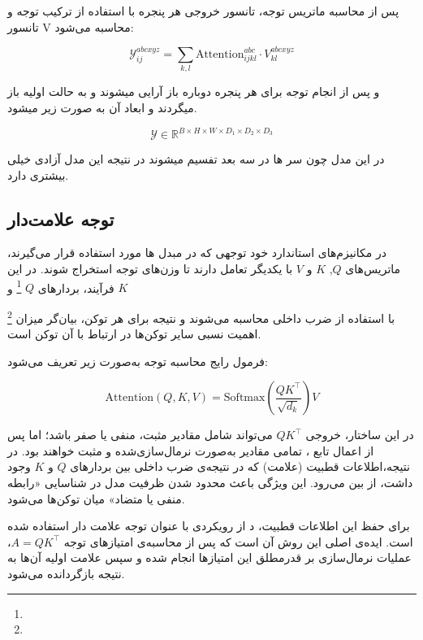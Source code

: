 پس از محاسبه ماتریس توجه، تانسور خروجی هر پنجره با استفاده از ترکیب توجه و تانسور V محاسبه می‌شود:

\begin{equation}
	\mathcal{Y}_{ij}^{abcxyz} = \sum_{k,l} \text{Attention}_{ijkl}^{abc} \cdot V_{kl}^{abcxyz}
\end{equation}


و پس از انجام توجه برای هر پنجره دوباره باز آرایی میشوند و به حالت اولیه باز میگردند و ابعاد آن به صورت زیر میشود.

\[
\mathcal{Y} \in \mathbb{R}^{B \times H \times W \times D_1 \times D_2 \times D_3}
\]

در این مدل چون سر ها در سه بعد تفسیم میشوند در نتیجه این مدل آزادی خیلی بیشتری دارد.






\subsection{توجه علامت‌دار}

در مکانیزم‌های استاندارد خود توجهی که در مبدل ها مورد استفاده قرار می‌گیرند، ماتریس‌های $Q$, $K$ و $V$ با یکدیگر تعامل دارند تا وزن‌های توجه استخراج شوند. در این فرآیند، بردارهای $Q$  \footnote{}
 و $K$ 
 
 \footnote{}
  با استفاده از ضرب داخلی محاسبه می‌شوند و نتیجه برای هر توکن، بیان‌گر میزان اهمیت نسبی سایر توکن‌ها در ارتباط با آن توکن است.

فرمول رایج محاسبه توجه به‌صورت زیر تعریف می‌شود:

\begin{equation}
	\text{Attention}(Q, K, V) = \text{Softmax}\left( \frac{QK^\top}{\sqrt{d_k}} \right) V
\end{equation}

در این ساختار، خروجی $QK^\top$ می‌تواند شامل مقادیر مثبت، منفی یا صفر باشد؛ اما پس از اعمال تابع ، تمامی مقادیر به‌صورت نرمال‌سازی‌شده و مثبت خواهند بود. در نتیجه،اطلاعات قطبیت (علامت) که در نتیجه‌ی ضرب داخلی بین بردارهای $Q$ و $K$ وجود داشت، از بین می‌رود. این ویژگی باعث محدود شدن ظرفیت مدل در شناسایی «رابطه منفی یا متضاد» میان توکن‌ها می‌شود.

برای حفظ این اطلاعات قطبیت، د از رویکردی با عنوان  توجه علامت دار استفاده شده است. ایده‌ی اصلی این روش آن است که پس از محاسبه‌ی امتیازهای توجه $A = QK^\top$، عملیات نرمال‌سازی  بر قدرمطلق این امتیازها انجام شده و سپس علامت اولیه آن‌ها به نتیجه بازگردانده می‌شود.

